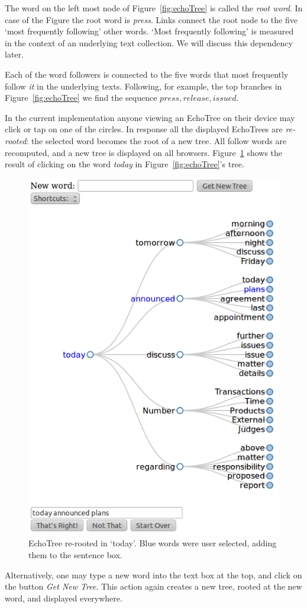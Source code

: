 \documentclass{sigchi}
\begin{document}
The word on the left most node of Figure~\ref{fig:echoTree} is called
the {\em root word}. In case of the Figure the root word is {\em
  press}. Links connect the root node to the five `most frequently
following' other words.  `Most frequently following' is measured in
the context of an underlying text collection. We will discuss this
dependency later.

Each of the word followers is connected to the five words that most
frequently follow {\em it} in the underlying texts. Following, for
example, the top branches in Figure~\ref{fig:echoTree} we find the
sequence ${press, release, issued}$.

In the current implementation anyone viewing an EchoTree on their
device may click or tap on one of the circles. In response all the
displayed EchoTrees are {\em re-rooted}: the selected word becomes the
root of a new tree. All follow words are recomputed, and a new tree is
displayed on all browsers. Figure~\ref{fig:todayTree} shows the result
of clicking on the word {\em today} in Figure~\ref{fig:echoTree}'s
tree. 
\begin{figure}
   \centering
   \includegraphics[width=0.6\columnwidth]{Figs/echoTreeRootToday.png}
   \caption{EchoTree re-rooted in `today'. Blue words were user
     selected, adding them to the sentence box.}
   \label{fig:todayTree}
\end{figure}
Alternatively, one may type a new word into the text box at the top,
and click on the button {\em Get New Tree}. This action again creates
a new tree, rooted at the new word, and displayed everywhere.
\end{document}
